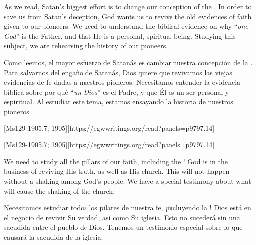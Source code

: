 As we read, Satan’s biggest effort is to change our conception of the . In order to save us from Satan’s deception, God wants us to revive the old evidences of faith given to our pioneers. We need to understand the biblical evidence on why “\textit{one God}” is the Father, and that He is a personal, spiritual being. Studying this subject, we are rehearsing the history of our pioneers.


Como leemos, el mayor esfuerzo de Satanás es cambiar nuestra concepción de la . Para salvarnos del engaño de Satanás, Dios quiere que revivamos las viejas evidencias de fe dadas a nuestros pioneros. Necesitamos entender la evidencia bíblica sobre por qué “\textit{un Dios}” es el Padre, y que Él es un ser personal y espiritual. Al estudiar este tema, estamos ensayando la historia de nuestros pioneros.


[Ms129-1905.7; 1905][https://egwwritings.org/read?panels=p9797.14]


[Ms129-1905.7; 1905][https://egwwritings.org/read?panels=p9797.14]


We need to study all the pillars of our faith, including the ! God is in the business of reviving His truth, as well as His church. This will not happen without a shaking among God’s people. We have a special testimony about what will cause the shaking of the church:


Necesitamos estudiar todos los pilares de nuestra fe, ¡incluyendo la ! Dios está en el negocio de revivir Su verdad, así como Su iglesia. Esto no sucederá sin una sacudida entre el pueblo de Dios. Tenemos un testimonio especial sobre lo que causará la sacudida de la iglesia:


